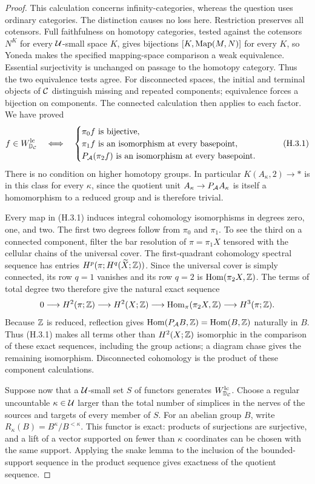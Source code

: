 \begin{proof}
This calculation concerns infinity-categories, whereas the question uses ordinary categories. The distinction causes no loss here. Restriction preserves all cotensors. Full faithfulness on homotopy categories, tested against the cotensors $N^K$ for every $\mathcal U$-small space $K$, gives bijections $[K,\operatorname{Map}(M,N)]$ for every $K$, so Yoneda makes the specified mapping-space comparison a weak equivalence. Essential surjectivity is unchanged on passage to the homotopy category. Thus the two equivalence tests agree. For disconnected spaces, the initial and terminal objects of $\mathcal C$ distinguish missing and repeated components; equivalence forces a bijection on components. The connected calculation then applies to each factor. We have proved
\[
 f\in W^{\mathrm{lc}}_{\mathbb D_{\mathcal C}}\quad\Longleftrightarrow\quad
 \begin{cases}
 \pi_0f\text{ is bijective},\\
 \pi_1f\text{ is an isomorphism at every basepoint},\\
 P_{\mathcal A}(\pi_2f)\text{ is an isomorphism at every basepoint}.
 \end{cases}                                                     \tag{H.3.1}
\]
There is no condition on higher homotopy groups. In particular $K(A_\kappa,2)\to*$ is in this class for every $\kappa$, since the quotient unit $A_\kappa\to P_{\mathcal A} A_\kappa$ is itself a homomorphism to a reduced group and is therefore trivial.

Every map in (H.3.1) induces integral cohomology isomorphisms in degrees zero, one, and two. The first two degrees follow from $\pi_0$ and $\pi_1$. To see the third on a connected component, filter the bar resolution of $\pi=\pi_1X$ tensored with the cellular chains of the universal cover. The first-quadrant cohomology spectral sequence has entries $H^p(\pi;H^q(\widetilde X;\mathbb Z))$. Since the universal cover is simply connected, its row $q=1$ vanishes and its row $q=2$ is $\operatorname{Hom}(\pi_2X,\mathbb Z)$. The terms of total degree two therefore give the natural exact sequence
\[
 0\longrightarrow H^2(\pi;\mathbb Z)\longrightarrow H^2(X;\mathbb Z)
 \longrightarrow\operatorname{Hom}_\pi(\pi_2X,\mathbb Z)
 \longrightarrow H^3(\pi;\mathbb Z).
\]
Because $\mathbb Z$ is reduced, reflection gives $\operatorname{Hom}(P_{\mathcal A} B,\mathbb Z)=\operatorname{Hom}(B,\mathbb Z)$ naturally in $B$. Thus (H.3.1) makes all terms other than $H^2(X;\mathbb Z)$ isomorphic in the comparison of these exact sequences, including the group actions; a diagram chase gives the remaining isomorphism. Disconnected cohomology is the product of these component calculations.

Suppose now that a $\mathcal U$-small set $S$ of functors generates $W^{\mathrm{lc}}_{\mathbb D_{\mathcal C}}$. Choose a regular uncountable $\kappa\in\mathcal U$ larger than the total number of simplices in the nerves of the sources and targets of every member of $S$. For an abelian group $B$, write $R_\kappa(B)=B^\kappa/B^{<\kappa}$. This functor is exact: products of surjections are surjective, and a lift of a vector supported on fewer than $\kappa$ coordinates can be chosen with the same support. Applying the snake lemma to the inclusion of the bounded-support sequence in the product sequence gives exactness of the quotient sequence.


\end{proof}
